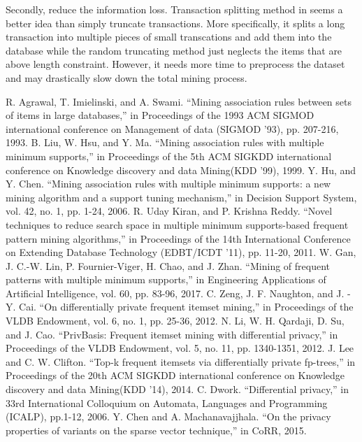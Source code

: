 \documentclass[conference]{IEEEtran}
\begin{document}
Secondly, reduce the information loss. 
Transaction splitting method in \cite{b20} seems a better idea than simply truncate transactions. 
More specifically, it splits a long transaction into multiple pieces of small transcations and add them into the database while the random truncating method just neglects the items that are above length constraint.
However, it needs more time to preprocess the dataset and may drastically slow down the total mining process.



\begin{thebibliography}{21}%
     R. Agrawal, T. Imielinski, and A. Swami. ``Mining association rules between sets of items in large databases,'' in Proceedings of the 1993 ACM SIGMOD international conference on Management of data (SIGMOD '93), pp. 207-216, 1993.
     B. Liu, W. Hsu, and Y. Ma. ``Mining association rules with multiple minimum supports,'' in Proceedings of the 5th ACM SIGKDD international conference on Knowledge discovery and data Mining(KDD '99), 1999.
     Y. Hu, and Y. Chen. ``Mining association rules with multiple minimum supports: a new mining algorithm and a support tuning mechanism,'' in Decision Support System, vol. 42, no. 1, pp. 1-24, 2006.
     R. Uday Kiran, and P. Krishna Reddy. ``Novel techniques to reduce search space in multiple minimum supports-based frequent pattern mining algorithms,'' in Proceedings of the 14th International Conference on Extending Database Technology (EDBT/ICDT '11), pp. 11-20, 2011.
     W. Gan, J. C.-W. Lin, P. Fournier-Viger, H. Chao, and J. Zhan. ``Mining of frequent patterns with multiple minimum supports,'' in Engineering Applications of Artificial Intelligence, vol. 60, pp. 83-96, 2017.
     C. Zeng, J. F. Naughton, and J. -Y. Cai. ``On differentially private frequent itemset mining,'' in Proceedings of the VLDB Endowment, vol. 6, no. 1, pp. 25-36, 2012.
     N. Li, W. H. Qardaji, D. Su, and J. Cao. ``PrivBasis: Frequent itemset mining with differential privacy,'' in Proceedings of the VLDB Endowment, vol. 5, no. 11, pp. 1340-1351, 2012.
     J. Lee and C. W. Clifton. ``Top-k frequent itemsets via differentially private fp-trees,'' in Proceedings of the 20th ACM SIGKDD international conference on Knowledge discovery and data Mining(KDD '14), 2014.
     C. Dwork. ``Differential privacy,'' in 33rd International Colloquium on Automata, Languages and Programming (ICALP), pp.1-12, 2006.
    Y. Chen and A. Machanavajjhala. ``On the privacy properties of variants on the sparse vector technique,'' in CoRR, 2015.

\end{thebibliography}
\end{document}
